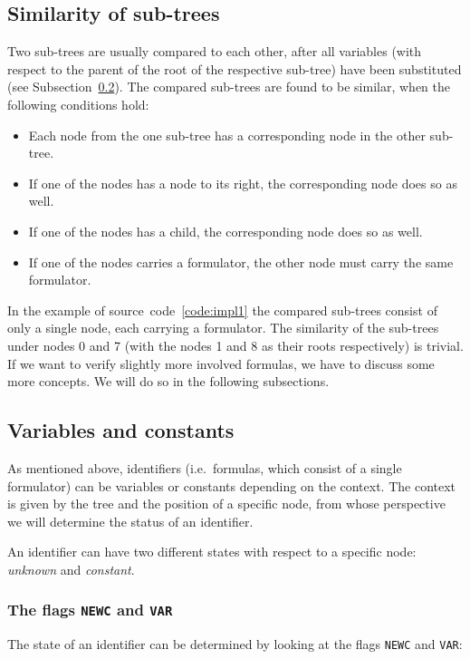 \documentclass[british]{article}
\begin{document}
\pagebreak{}

\subsection{Similarity of sub-trees}\label{sec:similar}
Two sub-trees are usually compared to each other, after all variables (with
respect to the parent of the root of the respective sub-tree) have been
substituted (see Subsection~\ref{sec:var}). The compared sub-trees are found to
be similar, when the following conditions hold:

\begin{itemize}
	\item 
		Each node from the one sub-tree has a corresponding node in the other
		sub-tree.
	\item
		If one of the nodes has a node to its right, the corresponding node does
		so as well.
	\item
		If one of the nodes has a child, the corresponding node does so as well.
	\item
		If one of the nodes carries a formulator, the other node must carry the
		same formulator.
\end{itemize}

In the example of source~code~\ref{code:impl1} the compared sub-trees consist of
only a single node, each carrying a formulator. The similarity of the sub-trees
under nodes 0 and 7 (with the nodes 1 and 8 as their roots respectively) is
trivial. If we want to verify slightly more involved formulas, we have to
discuss some more concepts. We will do so in the following subsections.

\subsection{Variables and constants}\label{sec:var}

As mentioned above, identifiers (i.e.\ formulas, which consist of a single
formulator) can be variables or constants depending on the context. The context
is given by the tree and the position of a specific node, from whose
perspective we will determine the status of an identifier.

\medskip{}
An identifier can have two different states with respect to a specific node:
\emph{unknown} and \emph{constant}.

\subsubsection{The flags \texttt{NEWC} and \texttt{VAR}}
The state of an identifier can be determined by looking at the flags
\texttt{NEWC} and \texttt{VAR}:
\end{document}
